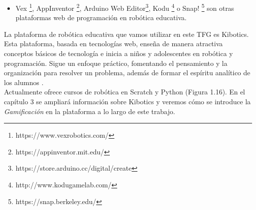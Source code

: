 \begin{itemize}
    \item Vex \footnote{https://www.vexrobotics.com/}, AppInventor \footnote{https://appinventor.mit.edu/}, Arduino Web Editor\footnote{https://store.arduino.cc/digital/create}, Kodu \footnote{http://www.kodugamelab.com/} o Snap! \footnote{https://snap.berkeley.edu/} son otras plataformas web de programación en robótica educativa.
\end{itemize}


La plataforma de robótica educativa que vamos utilizar en este TFG es Kibotics. Esta plataforma, basada en tecnologías web, enseña de manera atractiva conceptos básicos de tecnología e inicia a niños y adolescentes en robótica y programación. Sigue un enfoque práctico, fomentando el pensamiento y la organización para resolver un problema, además de formar el espíritu analítico de los alumnos \cite{intro}.
\\
Actualmente ofrece cursos de robótica en Scratch y Python (Figura 1.16). En el capítulo 3 se ampliará información sobre Kibotics y veremos cómo se introduce la \textit{Gamificación} en la plataforma a lo largo de este trabajo.

